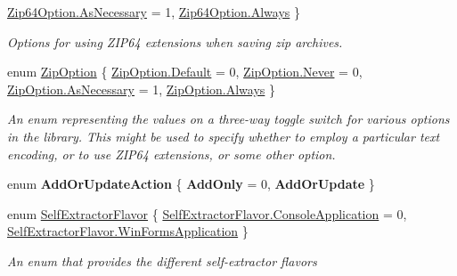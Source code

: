 \begin{DoxyCompactItemize}
\mbox{\hyperlink{namespace_super_tiled2_unity_1_1_ionic_1_1_zip_a0c873ba2a5b73de966e876643830dc69a7bfa2d7f3d5b79692fe22a06113406c8}{Zip64\+Option.\+As\+Necessary}} = 1, 
\mbox{\hyperlink{namespace_super_tiled2_unity_1_1_ionic_1_1_zip_a0c873ba2a5b73de966e876643830dc69a68eec46437c384d8dad18d5464ebc35c}{Zip64\+Option.\+Always}}
 \}
\begin{DoxyCompactList}\small\item\em Options for using Z\+I\+P64 extensions when saving zip archives. \end{DoxyCompactList}\item 
enum \mbox{\hyperlink{namespace_super_tiled2_unity_1_1_ionic_1_1_zip_a25d431031427c142eba970006eee630c}{Zip\+Option}} \{ \mbox{\hyperlink{namespace_super_tiled2_unity_1_1_ionic_1_1_zip_a25d431031427c142eba970006eee630ca7a1920d61156abc05a60135aefe8bc67}{Zip\+Option.\+Default}} = 0, 
\mbox{\hyperlink{namespace_super_tiled2_unity_1_1_ionic_1_1_zip_a25d431031427c142eba970006eee630ca6e7b34fa59e1bd229b207892956dc41c}{Zip\+Option.\+Never}} = 0, 
\mbox{\hyperlink{namespace_super_tiled2_unity_1_1_ionic_1_1_zip_a25d431031427c142eba970006eee630ca7bfa2d7f3d5b79692fe22a06113406c8}{Zip\+Option.\+As\+Necessary}} = 1, 
\mbox{\hyperlink{namespace_super_tiled2_unity_1_1_ionic_1_1_zip_a25d431031427c142eba970006eee630ca68eec46437c384d8dad18d5464ebc35c}{Zip\+Option.\+Always}}
 \}
\begin{DoxyCompactList}\small\item\em An enum representing the values on a three-\/way toggle switch for various options in the library. This might be used to specify whether to employ a particular text encoding, or to use Z\+I\+P64 extensions, or some other option. \end{DoxyCompactList}\item 
\mbox{\label{namespace_super_tiled2_unity_1_1_ionic_1_1_zip_a8f124e362f4ed3751ef5f0f3ba6085e3}} 
enum {\bfseries Add\+Or\+Update\+Action} \{ {\bfseries Add\+Only} = 0, 
{\bfseries Add\+Or\+Update}
 \}
\item 
enum \mbox{\hyperlink{namespace_super_tiled2_unity_1_1_ionic_1_1_zip_aa52d746f0c73d4f07fe6b2d188979963}{Self\+Extractor\+Flavor}} \{ \mbox{\hyperlink{namespace_super_tiled2_unity_1_1_ionic_1_1_zip_aa52d746f0c73d4f07fe6b2d188979963a9e6155c58429c83277586913ab5f0e11}{Self\+Extractor\+Flavor.\+Console\+Application}} = 0, 
\mbox{\hyperlink{namespace_super_tiled2_unity_1_1_ionic_1_1_zip_aa52d746f0c73d4f07fe6b2d188979963a92c4af478ae5363eaacde6de61c1a549}{Self\+Extractor\+Flavor.\+Win\+Forms\+Application}}
 \}
\begin{DoxyCompactList}\small\item\em An enum that provides the different self-\/extractor flavors \end{DoxyCompactList}\end{DoxyCompactItemize}
